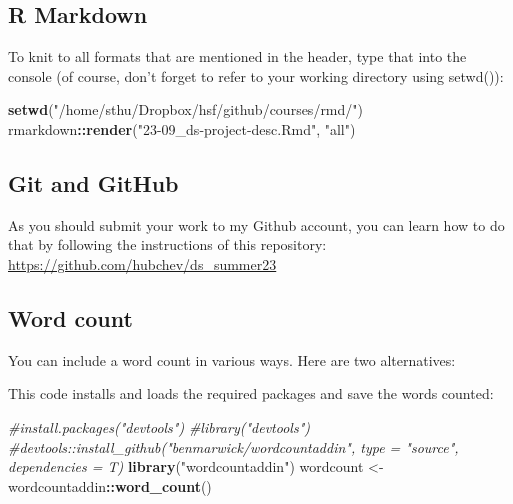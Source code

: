 \documentclass[
  12pt,
]{article}
\newenvironment{Shaded}{\begin{snugshade}}{\end{snugshade}}
\newcommand{\CommentTok}[1]{\textcolor[rgb]{0.56,0.35,0.01}{\textit{#1}}}
\newcommand{\FunctionTok}[1]{\textcolor[rgb]{0.13,0.29,0.53}{\textbf{#1}}}
\newcommand{\NormalTok}[1]{#1}
\newcommand{\OtherTok}[1]{\textcolor[rgb]{0.56,0.35,0.01}{#1}}
\newcommand{\SpecialCharTok}[1]{\textcolor[rgb]{0.81,0.36,0.00}{\textbf{#1}}}
\newcommand{\StringTok}[1]{\textcolor[rgb]{0.31,0.60,0.02}{#1}}
\begin{document}
\hypertarget{r-markdown}{%
\subsection{R Markdown}\label{r-markdown}}

To knit to all formats that are mentioned in the header, type that into the console (of course, don't forget to refer to your working directory using setwd()):

\begin{Shaded}
\begin{Highlighting}[]
\FunctionTok{setwd}\NormalTok{(}\StringTok{"/home/sthu/Dropbox/hsf/github/courses/rmd/"}\NormalTok{)}
\NormalTok{rmarkdown}\SpecialCharTok{::}\FunctionTok{render}\NormalTok{(}\StringTok{"23{-}09\_ds{-}project{-}desc.Rmd"}\NormalTok{, }\StringTok{"all"}\NormalTok{)}
\end{Highlighting}
\end{Shaded}

\hypertarget{git-and-github}{%
\subsection{Git and GitHub}\label{git-and-github}}

As you should submit your work to my Github account, you can learn how to do that by following the instructions of this repository: \url{https://github.com/hubchev/ds_summer23}

\hypertarget{word-count}{%
\subsection{Word count}\label{word-count}}

You can include a word count in various ways. Here are two alternatives:

This code installs and loads the required packages and save the words counted:

\begin{Shaded}
\begin{Highlighting}[]
\CommentTok{\#install.packages("devtools")}
\CommentTok{\#library("devtools")}
\CommentTok{\#devtools::install\_github("benmarwick/wordcountaddin", type = "source", dependencies = T)}
\FunctionTok{library}\NormalTok{(}\StringTok{"wordcountaddin"}\NormalTok{)}
\NormalTok{wordcount }\OtherTok{\textless{}{-}}\NormalTok{ wordcountaddin}\SpecialCharTok{::}\FunctionTok{word\_count}\NormalTok{()}
\end{Highlighting}
\end{Shaded}
\end{document}
